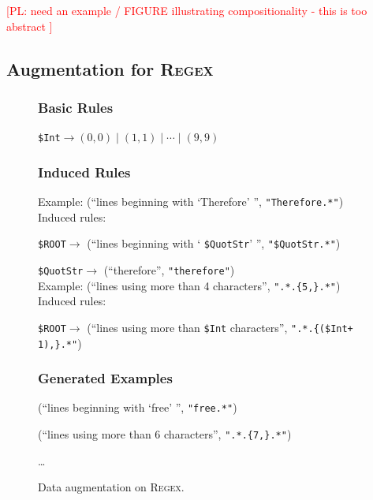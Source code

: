 \documentclass[11pt,letterpaper]{article}
\newcommand{\regex}{\textsc{Regex}\xspace}
\newcommand{\catroot}{\texttt{\$ROOT}\xspace}
\newcommand{\catquotstr}{\texttt{\$QuotStr}\xspace}
\newcommand{\catint}{\texttt{\$Int}\xspace}
\newcommand\pl[1]{\textcolor{red}{[PL: #1]}}
\begin{document}
\pl{need an example / FIGURE illustrating compositionality - this is too abstract
}



\subsection{Augmentation for \regex}
\begin{figure}[t] 
\small
\begin{framed}
\footnotesize
\subsubsection*{Basic Rules}
\catint $\to (0, 0) \mid (1, 1) \mid \dotsb \mid (9, 9)$

\subsubsection*{Induced Rules}
Example: (``lines beginning with `Therefore' '', \texttt{"Therefore.*"})\\
Induced rules:

\quad \catroot $\to$ (``lines beginning with ` \catquotstr ' '', \texttt{"}\catquotstr\texttt{.*"})

\quad \catquotstr $\to$ (``therefore'', \texttt{"therefore"}) \\

Example: (``lines using more than 4 characters'', \texttt{".*.\{5,\}.*"})\\
Induced rules:

\quad \catroot $\to$ (``lines using more than \catint characters'', \texttt{".*.\{(\catint + 1),\}.*"})

\subsubsection*{Generated Examples} 
(``lines beginning with `free' '', \texttt{"free.*"})

(``lines using more than 6 characters'', \texttt{".*.\{7,\}.*"})

\dots
\end{framed}
\caption{Data augmentation on \regex.}
\label{fig:augment-regex}
\end{figure}
\end{document}
